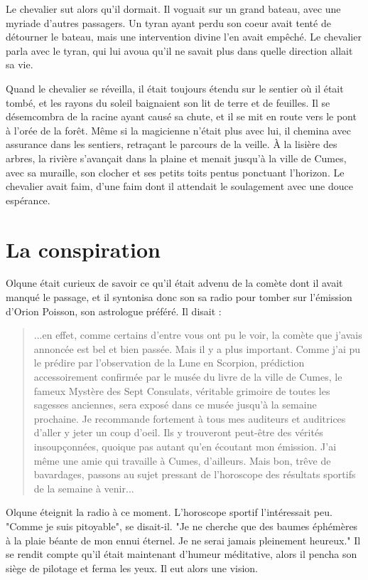 \documentclass[a4paper,11pt, openany]{book}
\begin{document}
Le chevalier sut alors qu'il dormait. Il voguait sur un grand bateau, avec une myriade d'autres passagers. 
Un tyran ayant perdu son coeur avait tenté de détourner le bateau, mais une intervention divine l'en avait empêché.
Le chevalier parla avec le tyran, qui lui avoua qu'il ne savait plus dans quelle direction allait sa vie.   

Quand le chevalier se réveilla, il était toujours étendu sur le sentier où il était tombé, et les rayons du soleil
baignaient son lit de terre et de feuilles. Il se désemcombra de la racine ayant causé sa chute, et il se mit en route vers le pont à l'orée de la forêt.
Même si la magicienne n'était plus avec lui, il chemina avec assurance dans les sentiers, retraçant le parcours de la veille.
À la lisière des arbres, la rivière s'avançait dans la plaine et menait jusqu'à la ville de Cumes, avec sa muraille, son clocher et ses petits toits pentus ponctuant l'horizon. 
Le chevalier avait faim, d'une faim dont il attendait le soulagement avec une douce espérance.

\chapter{La conspiration}

Olqune était curieux de savoir ce qu'il était advenu de la comète dont il avait manqué le passage, et il syntonisa donc son sa radio pour tomber sur l'émission d'Orion Poisson, son astrologue préféré.
Il disait : 

\begin{quote}
...en effet, comme certains d'entre vous ont pu le voir, la comète que j'avais annoncée est bel et bien passée. Mais il y a plus important. Comme j'ai pu le prédire par l'observation de la Lune en Scorpion,
prédiction accessoirement confirmée par le musée du livre de la ville de Cumes, le fameux Mystère des Sept Consulats, véritable grimoire de toutes les sagesses anciennes, sera exposé dans ce musée jusqu'à la semaine prochaine.
Je recommande fortement à tous mes auditeurs et auditrices d'aller y jeter un coup d'oeil. Ils y trouveront peut-être des vérités insoupçonnées, quoique pas autant qu'en écoutant mon émission. J'ai même une amie qui travaille à Cumes, d'ailleurs.
Mais bon, trêve de bavardages, passons au sujet pressant de l'horoscope des résultats sportifs de la semaine à venir...
\end{quote}

Olqune éteignit la radio à ce moment. L'horoscope sportif l'intéressait peu. 
"Comme je suis pitoyable", se disait-il. "Je ne cherche que des baumes éphémères à la plaie béante de mon ennui éternel. Je ne serai jamais pleinement heureux."
Il se rendit compte qu'il était maintenant d'humeur méditative, alors il pencha son siège de pilotage et ferma les yeux.
Il eut alors une vision. 
\end{document}
